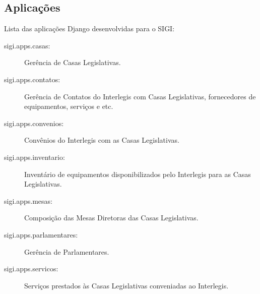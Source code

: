 
\hypertarget{aplica-es}{}
\subsection*{Aplicações}

Lista das aplicações Django desenvolvidas para o SIGI:
\begin{description}
\item[{sigi.apps.casas}:] %

Gerência de Casas Legislativas.

\item[{sigi.apps.contatos}:] %

Gerência de Contatos do Interlegis com Casas Legislativas,
fornecedores de equipamentos, serviços e etc.

\item[{sigi.apps.convenios}:] %

Convênios do Interlegis com as Casas Legislativas.

\item[{sigi.apps.inventario}:] %

Inventário de equipamentos disponibilizados pelo Interlegis para as
Casas Legislativas.

\item[{sigi.apps.mesas}:] %

Composição das Mesas Diretoras das Casas Legislativas.

\item[{sigi.apps.parlamentares}:] %

Gerência de Parlamentares.

\item[{sigi.apps.servicos}:] %

Serviços prestados às Casas Legislativas conveniadas ao Interlegis.

\end{description}


